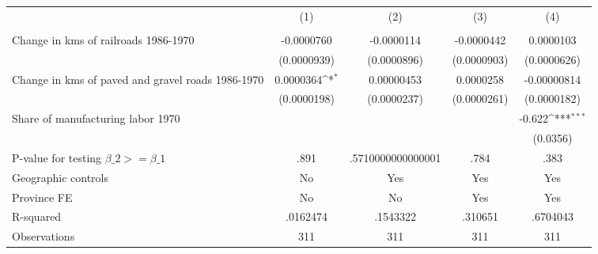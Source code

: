 {
\def\sym#1{\ifmmode^{#1}\else\(^{#1}\)\fi}
\begin{tabular}{l*{4}{c}}
\hline\hline
                &\multicolumn{1}{c}{(1)}&\multicolumn{1}{c}{(2)}&\multicolumn{1}{c}{(3)}&\multicolumn{1}{c}{(4)}\\
                &\multicolumn{1}{c}{}&\multicolumn{1}{c}{}&\multicolumn{1}{c}{}&\multicolumn{1}{c}{}\\
\hline
Change in kms of railroads 1986-1970&-0.0000760         &-0.0000114         &-0.0000442         &0.0000103         \\
                &(0.0000939)         &(0.0000896)         &(0.0000903)         &(0.0000626)         \\
[1em]
Change in kms of paved and gravel roads 1986-1970&0.0000364\sym{*}  &0.00000453         &0.0000258         &-0.00000814         \\
                &(0.0000198)         &(0.0000237)         &(0.0000261)         &(0.0000182)         \\
[1em]
Share of manufacturing labor 1970&                  &                  &                  &   -0.622\sym{***}\\
                &                  &                  &                  & (0.0356)         \\
\hline
P-value for testing $\beta\_{2} >= \beta\_{1}$&     .891         &.5710000000000001         &     .784         &     .383         \\
Geographic controls&       No         &      Yes         &      Yes         &      Yes         \\
Province FE     &       No         &       No         &      Yes         &      Yes         \\
R-squared       & .0162474         & .1543322         &  .310651         & .6704043         \\
Observations    &      311         &      311         &      311         &      311         \\
\hline\hline
\end{tabular}
}
